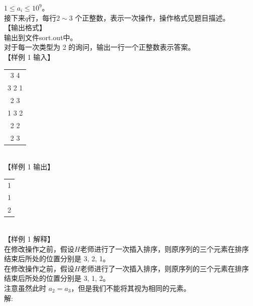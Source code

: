 \documentclass[12pt,twiside,a4paper]{ctexbook}
\numberwithin{chapter}{part}
\begin{document}
$1 \leq a_i \leq 10^9$。\\
接下来$q$行，每行$2 \sim 3$ 个正整数，表示一次操作，操作格式见题目描述。\\
【输出格式】\\
输出到文件sort.out中。\\
对于每一次类型为 2 的询问，输出一行一个正整数表示答案。\\
【样例 1 输入】\\
\begin{tabular}{|c|}
  \hline
  3 4 \\
  3 2 1 \\
  2 3 \\
  1 3 2 \\
  2 2 \\
  2 3 \\
  \hline
\end{tabular}\\
【样例 1 输出】\\
\begin{tabular}{|c|}
  \hline
  1 \\
  1 \\
  2 \\
  \hline
\end{tabular}\\
【样例 1 解释】\\
在修改操作之前，假设$H$老师进行了一次插入排序，则原序列的三个元素在排序
结束后所处的位置分别是 3, 2, 1。\\
在修改操作之前，假设$H$老师进行了一次插入排序，则原序列的三个元素在排序
结束后所处的位置分别是 3, 1, 2。\\
注意虽然此时 $a_2 = a_3$，但是我们不能将其视为相同的元素。\\
解:
\end{document}
